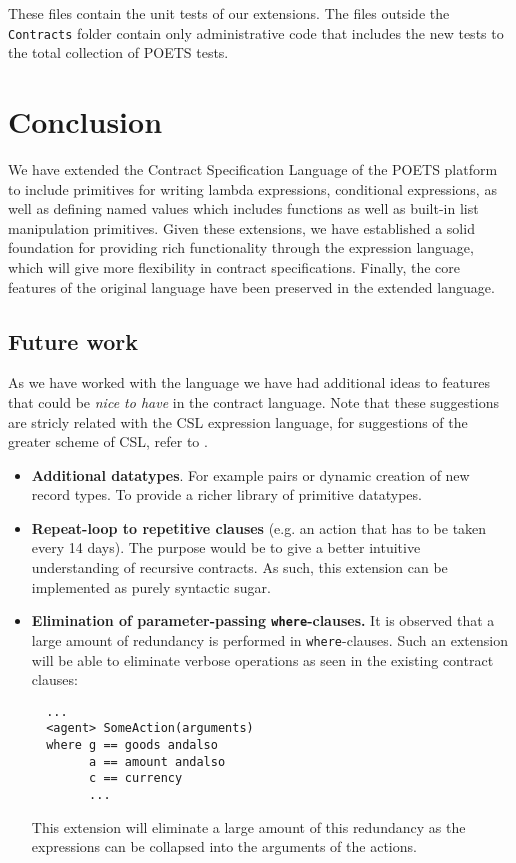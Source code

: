 \documentclass[10pt,a4paper,final,oneside,openany,article]{memoir}
\begin{document}
These files contain the unit tests of our extensions. The files
outside the \verb+Contracts+ folder contain only administrative code
that includes the new tests to the total collection of POETS tests.

\chapter{Conclusion}
We have extended the Contract Specification Language of the POETS
platform to include primitives for writing lambda expressions,
conditional expressions, as well as defining named values which includes
functions as well as built-in list manipulation primitives. Given these
extensions, we have established a solid foundation for providing rich
functionality through the expression language, which will give more
flexibility in contract specifications.
Finally, the core features of the original language \cite[page
4]{hvitved10} have been preserved in the extended language.


\section{Future work}
As we have worked with the language we have had additional ideas to
features that could be \textit{nice to have} in the contract language.
Note that these suggestions are stricly related with the CSL expression
language, for suggestions of the greater scheme of CSL, refer to
\cite{hvitved10}.
\begin{itemize}
\item \textbf{Additional datatypes}. For example pairs or dynamic
  creation of new record types. To provide a richer library of primitive
  datatypes.
\item \textbf{Repeat-loop to repetitive clauses} (e.g. an action that
  has to be taken every 14 days). The purpose would be to give a better
  intuitive understanding of recursive contracts. As such, this
  extension can be implemented as purely syntactic sugar.
\item \textbf{Elimination of parameter-passing \lstinline{where}-clauses.} It is
  observed that a large amount of redundancy is performed in
  \lstinline{where}-clauses. Such an extension will be able to eliminate
  verbose operations as seen in the existing contract clauses:
  \begin{lstlisting}
  ...
  <agent> SomeAction(arguments)
  where g == goods andalso
        a == amount andalso
        c == currency
        ...
  \end{lstlisting}
  This extension will eliminate a large amount of this redundancy as
  the expressions can be collapsed into the arguments of the actions.
\end{itemize}
\end{document}
